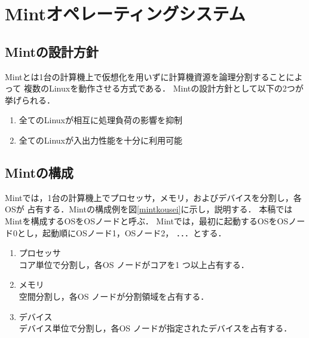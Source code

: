 \documentclass[submit,techreq,noauthor,dvipdfmx]{ipsj}
\begin{document}
\section{Mintオペレーティングシステム}\label{chap:Mint}

\subsection{Mintの設計方針}\label{sec:design_policy_of_Mint}

Mintとは1台の計算機上で仮想化を用いずに計算機資源を論理分割することによって
複数のLinuxを動作させる方式である．
Mintの設計方針として以下の2つが挙げられる．

\begin{enumerate}
    \item 全てのLinuxが相互に処理負荷の影響を抑制
    \item 全てのLinuxが入出力性能を十分に利用可能
\end{enumerate}

\subsection{Mintの構成}\label{sec:structure_of_Mint}


Mintでは，1台の計算機上でプロセッサ，メモリ，およびデバイスを分割し，各OSが
占有する．Mintの構成例を図\ref{mintkousei}に示し，説明する．
本稿ではMintを構成するOSをOSノードと呼ぶ．
Mintでは，最初に起動するOSをOSノード0とし，起動順にOSノード1，OSノード2，
．．．とする．

\begin{enumerate}
    \item プロセッサ\\
        コア単位で分割し，各OS ノードがコアを1 つ以上占有する．
    \item メモリ\\
        空間分割し，各OS ノードが分割領域を占有する．
    \item デバイス\\
        デバイス単位で分割し，各OS ノードが指定されたデバイスを占有する．
\end{enumerate}

\end{document}
